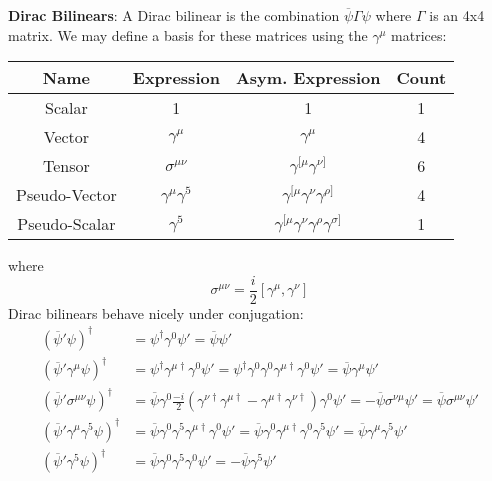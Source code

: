 \documentclass[12pt]{article}
\theoremstyle{definition}
\begin{document}
\textbf{Dirac Bilinears}: A Dirac bilinear is the combination $\overline{\psi} \Gamma \psi$ where
$\Gamma$ is an 4x4 matrix. We may define a basis for these matrices using the $\gamma^\mu$ matrices:
\begin{center}
    \begin{tabular}{c c c c}
        Name & Expression & Asym. Expression & Count \\
        \hline
        Scalar & 1 & 1 & 1 \\
        Vector & $\gamma^\mu$ & $\gamma^\mu$ & 4 \\
        Tensor & $\sigma^{\mu\nu}$ & $\gamma^{[\mu} \gamma^{\nu]}$ & 6 \\
        Pseudo-Vector & $\gamma^\mu \gamma^5$ & $\gamma^{[\mu} \gamma^\nu \gamma^{\rho]}$ & 4 \\
        Pseudo-Scalar & $\gamma^5$ & $\gamma^{[\mu} \gamma^\nu \gamma^\rho \gamma^{\sigma]}$ & 1 \\
    \end{tabular}
\end{center}
where
\begin{equation*}
    \sigma^{\mu\nu} = \frac{i}{2} [\gamma^\mu, \gamma^\nu]
\end{equation*}
Dirac bilinears behave nicely under conjugation:
\begin{equation*}
\begin{split}
    (\overline{\psi}' \psi)^\dagger &= \psi^\dagger \gamma^0 \psi' = \overline{\psi} \psi' \\
    (\overline{\psi}' \gamma^\mu \psi)^\dagger &= \psi^\dagger \gamma^{\mu\dagger} \gamma^0 \psi' = \psi^\dagger \gamma^0 \gamma^0 \gamma^{\mu\dagger} \gamma^0 \psi' = \overline{\psi} \gamma^\mu \psi' \\
    (\overline{\psi}' \sigma^{\mu\nu} \psi)^\dagger &= \overline{\psi} \gamma^0 \frac{-i}{2} (\gamma^{\nu\dagger} \gamma^{\mu\dagger} - \gamma^{\mu\dagger} \gamma^{\nu\dagger}) \gamma^0 \psi' = - \overline{\psi} \sigma^{\nu\mu} \psi' = \overline{\psi} \sigma^{\mu\nu} \psi' \\
    (\overline{\psi}' \gamma^\mu \gamma^5 \psi)^\dagger &= \overline{\psi} \gamma^0 \gamma^5 \gamma^{\mu\dagger} \gamma^0 \psi' = \overline{\psi} \gamma^0 \gamma^{\mu\dagger} \gamma^0 \gamma^5 \psi' = \overline{\psi} \gamma^\mu \gamma^5 \psi' \\
    (\overline{\psi}' \gamma^5 \psi)^\dagger &= \overline{\psi} \gamma^0 \gamma^5 \gamma^0 \psi' = -\overline{\psi} \gamma^5 \psi' \\
\end{split}
\end{equation*}
\end{document}
